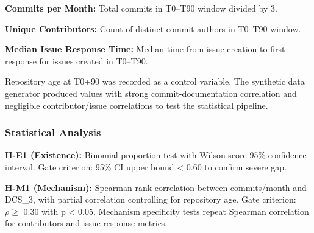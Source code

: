 \textbf{Commits per Month:} Total commits in T0--T90 window divided by 3.

\textbf{Unique Contributors:} Count of distinct commit authors in T0--T90 window.

\textbf{Median Issue Response Time:} Median time from issue creation to first response for issues created in T0--T90.

Repository age at T0+90 was recorded as a control variable. The synthetic data generator produced values with strong commit-documentation correlation and negligible contributor/issue correlations to test the statistical pipeline.

\subsubsection{Statistical Analysis}

\textbf{H-E1 (Existence):} Binomial proportion test with Wilson score 95\% confidence interval. Gate criterion: 95\% CI upper bound < 0.60 to confirm severe gap.

\textbf{H-M1 (Mechanism):} Spearman rank correlation between commits/month and DCS\_3, with partial correlation controlling for repository age. Gate criterion: $\rho \geq$ 0.30 with p < 0.05. Mechanism specificity tests repeat Spearman correlation for contributors and issue response metrics.
